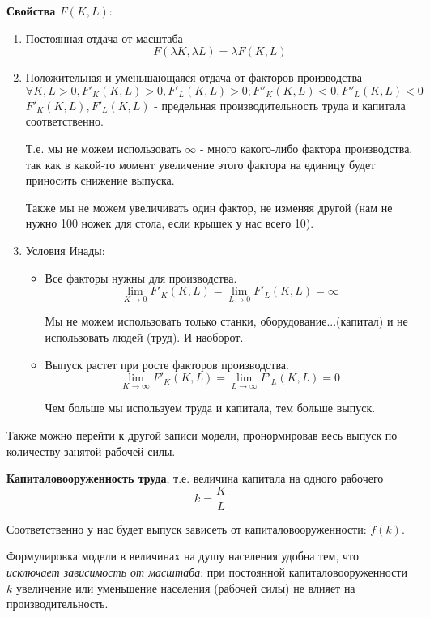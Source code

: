 \documentclass[reqno]{article}
\theoremstyle{definition}
\theoremstyle{definition}
\theoremstyle{definition}
\theoremstyle{definition}
\theoremstyle{definition}
\theoremstyle{definition}
\theoremstyle{definition}
\theoremstyle{definition}
\theoremstyle{definition}
\begin{document}
	\textbf{Свойства $F(K,L)$}:
	\begin{enumerate}
		\item Постоянная отдача от масштаба 
		$$F(\lambda K, \lambda L) = \lambda F(K, L)$$
		
		\item Положительная и уменьшающаяся отдача от факторов производства
		$$\forall K,L > 0, F'_K (K, L) > 0, F'_L (K, L) > 0; F''_K (K, L) < 0, F''_L (K, L) < 0 $$
		$F'_K (K, L), F'_L (K, L)$ - предельная производительность труда и капитала соответственно.
		
		Т.е. мы не можем использовать $\infty$ - много какого-либо фактора производства, так как в какой-то момент увеличение этого фактора на единицу будет приносить снижение выпуска.
		
		Также мы не можем увеличивать один фактор, не изменяя другой (нам не нужно 100 ножек для стола, если крышек у нас всего 10).
		
		\item Условия Инады:
		\begin{itemize}
			\item Все факторы нужны для производства.
			$$\lim_{K \rightarrow 0} F'_K (K, L) = \lim_{L \rightarrow 0} F'_L (K, L) = \infty$$
			
			Мы не можем использовать только станки, оборудование...(капитал) и не использовать людей (труд). И наоборот.
			
			\item Выпуск растет при росте факторов производства.
			$$\lim_{K \rightarrow \infty} F'_K (K, L) = \lim_{L \rightarrow \infty} F'_L (K, L) = 0$$
			
			Чем больше мы используем труда и капитала, тем больше выпуск.
		\end{itemize}
	\end{enumerate}
	
	Также можно перейти к другой записи модели, пронормировав весь выпуск по количеству занятой рабочей силы.
	
	\textbf{Капиталовооруженность труда}, т.е. величина капитала на одного рабочего $$k=\frac{K}{L}$$
	
	Соответственно у нас будет выпуск зависеть от капиталовооруженности: $f(k)$.
	
	Формулировка модели в величинах на душу населения удобна тем, что \emph{исключает зависимость от масштаба}: при постоянной капиталовооруженности $k$ увеличение или уменьшение населения (рабочей силы) не влияет на производительность.
	
\end{document}
